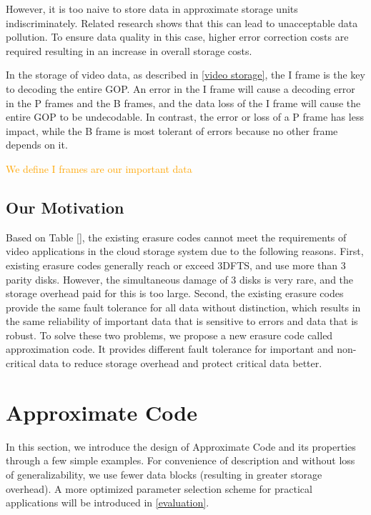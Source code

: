 \documentclass[sigconf]{acmart}
\begin{document}
However, it is too naive to store data in approximate storage units indiscriminately. Related research \cite{guo2016high} shows that this can lead to unacceptable data pollution. To ensure data quality in this case, higher error correction costs are required resulting in an increase in overall storage costs.

In the storage of video data, as described in \ref{video storage}, the I frame is the key to decoding the entire GOP. An error in the I frame will cause a decoding error in the P frames and the B frames, and the data loss of the I frame will cause the entire GOP to be undecodable. In contrast, the error or loss of a P frame has less impact, while the B frame is most tolerant of errors because no other frame depends on it.

\textcolor{orange}{We define I frames are our important data}






\subsection{Our Motivation}
Based on Table [], the existing erasure codes cannot meet the requirements of video applications in the cloud storage system due to the following reasons. First, existing erasure codes generally reach or exceed 3DFTS, and use more than 3 parity disks. However, the simultaneous damage of 3 disks is very rare, and the storage overhead paid for this is too large. Second, the existing erasure codes provide the same fault tolerance for all data without distinction, which results in the same reliability of important data that is sensitive to errors and data that is robust. To solve these two problems, we propose a new erasure code called approximation code. It provides different fault tolerance for important and non-critical data to reduce storage overhead and protect critical data better.

\section{Approximate Code}\label{ApCode}
In this section, we introduce the design of Approximate Code and its properties through a few simple examples. For convenience of description and without loss of generalizability, we use fewer data blocks (resulting in greater storage overhead). A more optimized parameter selection scheme for practical applications will be introduced in \ref{evaluation}.
\end{document}
